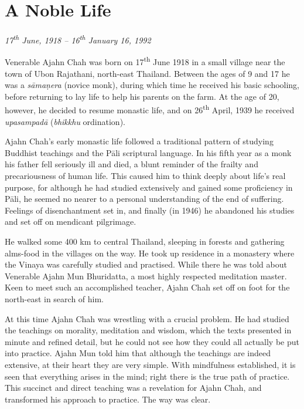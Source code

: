 
\chapter{A Noble Life}

\noindent
\emph{17\textsuperscript{th} June, 1918 -- 16\textsuperscript{th} January 16, 1992}

\bigskip
\noindent
Venerable Ajahn Chah was born on 17\textsuperscript{th} June 1918 in a small village near
the town of Ubon Rajathani, north-east Thailand. Between the ages of 9
and 17 he was a \emph{sāmaṇera} (novice monk), during which time he
received his basic schooling, before returning to lay life to help his
parents on the farm. At the age of 20, however, he decided to resume
monastic life, and on 26\textsuperscript{th} April, 1939 he received \emph{upasampadā}
(\emph{bhikkhu} ordination).

Ajahn Chah's early monastic life followed a traditional pattern of
studying Buddhist teachings and the Pāli scriptural language. In his
fifth year as a monk his father fell seriously ill and died, a blunt reminder of
the frailty and precariousness of human life. This caused him to think
deeply about life's real purpose, for although he had studied
extensively and gained some proficiency in Pāli, he seemed no nearer to
a personal understanding of the end of suffering. Feelings of
disenchantment set in, and finally (in 1946) he abandoned his studies
and set off on mendicant pilgrimage. 

He walked some 400 km to central Thailand, sleeping in forests and
gathering alms-food in the villages on the way. He took up residence in a
monastery where the Vinaya was carefully studied and practised. While
there he was told about Venerable Ajahn Mun Bhuridatta, a most highly
respected meditation master. Keen to meet such an accomplished teacher, 
Ajahn Chah set off on foot for the north-east in search of him. 

At this time Ajahn Chah was wrestling with a crucial problem. He had
studied the teachings on morality, meditation and wisdom, which the
texts presented in minute and refined detail, but he could not see how
they could all actually be put into practice. Ajahn Mun told him that
although the teachings are indeed extensive, at their heart they are
very simple. With mindfulness established, it is seen that everything
arises in the mind; right there is the true path of practice. This
succinct and direct teaching was a revelation for Ajahn Chah, and
transformed his approach to practice. The way was clear. 

